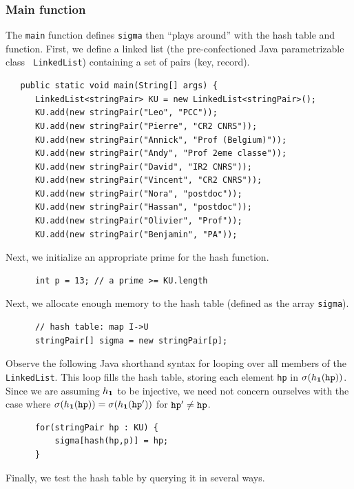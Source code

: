 \documentclass[a4paper]{book}
\theoremstyle{changebreak}                %
\begin{document}
\subsubsection{Main function}
\label{s:hash:main}
The {\tt main} function defines {\tt sigma} then ``plays around'' with
the hash table and function. First, we define a linked list (the
pre-confectioned Java parametrizable class {\tt
  LinkedList}) containing a set of pairs (key,
record).
\begin{verbatim}
   public static void main(String[] args) {
      LinkedList<stringPair> KU = new LinkedList<stringPair>();
      KU.add(new stringPair("Leo", "PCC"));
      KU.add(new stringPair("Pierre", "CR2 CNRS"));
      KU.add(new stringPair("Annick", "Prof (Belgium)"));
      KU.add(new stringPair("Andy", "Prof 2eme classe"));
      KU.add(new stringPair("David", "IR2 CNRS"));
      KU.add(new stringPair("Vincent", "CR2 CNRS"));
      KU.add(new stringPair("Nora", "postdoc"));
      KU.add(new stringPair("Hassan", "postdoc"));
      KU.add(new stringPair("Olivier", "Prof"));
      KU.add(new stringPair("Benjamin", "PA"));
\end{verbatim}
Next, we initialize an appropriate prime for the hash
function.
\begin{verbatim}
      int p = 13; // a prime >= KU.length
\end{verbatim}
Next, we allocate enough memory to the hash table
(defined as the array {\tt sigma}).
\begin{verbatim}
      // hash table: map I->U
      stringPair[] sigma = new stringPair[p]; 
\end{verbatim}
Observe the following Java shorthand syntax for looping over all
members of the {\tt LinkedList}. This
loop fills the hash table, storing each
element {\tt hp} in $\sigma(h_{\bf 1}(\mbox{\tt hp}))$.  Since we are
assuming $h_{\bf 1}$ to be injective, we need not
concern ourselves with the case where $\sigma(h_{\bf 1}(\mbox{\tt
  hp}))=\sigma(h_{\bf 1}(\mbox{\tt hp}'))$ for $\mbox{\tt
  hp}'\not=\mbox{\tt hp}$.
\begin{verbatim}
      for(stringPair hp : KU) {
          sigma[hash(hp,p)] = hp;
      }
\end{verbatim}
Finally, we test the hash table by querying it in several ways.
\end{document}
